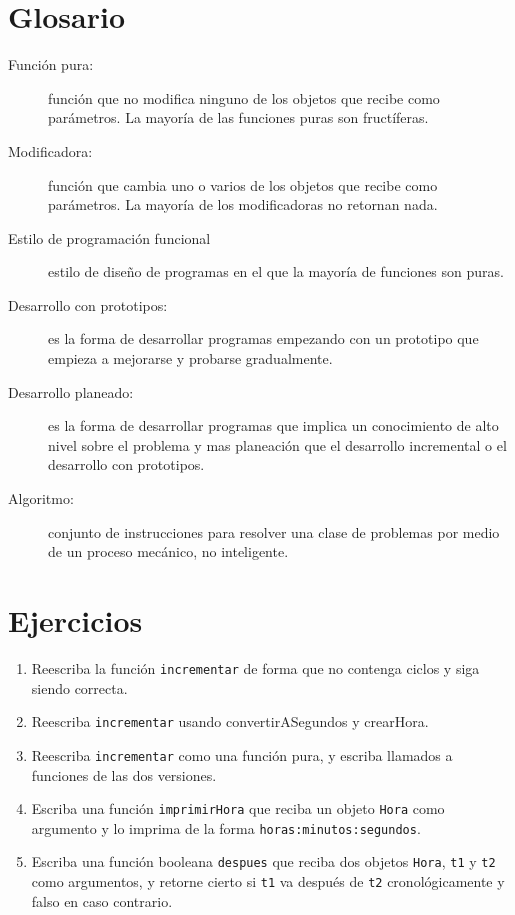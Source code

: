 \section{Glosario}
\begin{description}
\item [{Función pura:}] función que no modifica ninguno de los objetos
que recibe como parámetros. La mayoría de las funciones puras son
fructíferas.
\item [{Modificadora:}] función que cambia uno o varios de los objetos
que recibe como parámetros. La mayoría de los modificadoras no retornan
nada.
\item [{Estilo de programación funcional}] estilo de diseño de programas
en el que la mayoría de funciones son puras.
\item [{Desarrollo con prototipos:}] es la forma de desarrollar programas
empezando con un prototipo que empieza a mejorarse y probarse gradualmente.
\item [{Desarrollo planeado:}] es la forma de desarrollar programas que
implica un conocimiento de alto nivel sobre el problema y mas planeación
que el desarrollo incremental o el desarrollo con prototipos.
\item [{Algoritmo:}] conjunto de instrucciones para resolver una clase
de problemas por medio de un proceso mecánico, no inteligente.

  
  
 
\end{description}

\section{Ejercicios}
\begin{enumerate}
\item Reescriba la función \texttt{incrementar} de forma que no contenga
ciclos y siga siendo correcta.
\item Reescriba \texttt{incrementar} usando convertirASegundos y crearHora.
\item Reescriba \texttt{incrementar} como una función pura, y escriba llamados
a funciones de las dos versiones.
\item Escriba una función \texttt{imprimirHora} que reciba un objeto \texttt{Hora}
como argumento y lo imprima de la forma \texttt{horas:minutos:segundos}.
\item Escriba una función booleana \texttt{despues} que reciba dos objetos
\texttt{Hora}, \texttt{t1} y \texttt{t2} como argumentos, y retorne
cierto si \texttt{t1} va después de \texttt{t2} cronológicamente y
falso en caso contrario.
\end{enumerate}

